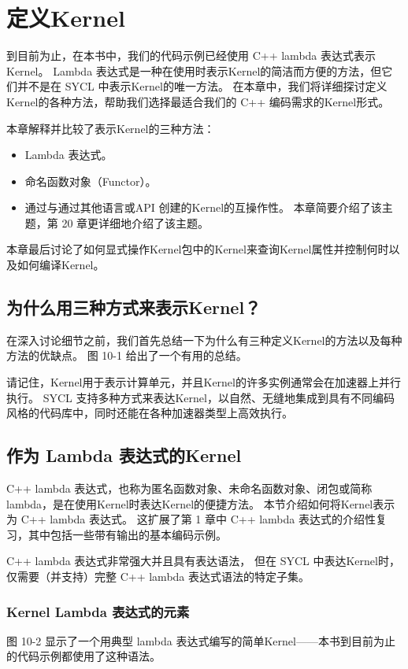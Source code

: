 \section{定义Kernel}
到目前为止，在本书中，我们的代码示例已经使用 C++ lambda 表达式表示Kernel。 
Lambda 表达式是一种在使用时表示Kernel的简洁而方便的方法，但它们并不是在 SYCL 中表示Kernel的唯一方法。 
在本章中，我们将详细探讨定义Kernel的各种方法，帮助我们选择最适合我们的 C++ 编码需求的Kernel形式。

本章解释并比较了表示Kernel的三种方法：

\begin{itemize}
	\item Lambda 表达式。

	\item 命名函数对象（Functor）。

	\item 通过与通过其他语言或API 创建的Kernel的互操作性。 本章简要介绍了该主题，第 20 章更详细地介绍了该主题。
\end{itemize}

本章最后讨论了如何显式操作Kernel包中的Kernel来查询Kernel属性并控制何时以及如何编译Kernel。


\subsection{为什么用三种方式来表示Kernel？}
在深入讨论细节之前，我们首先总结一下为什么有三种定义Kernel的方法以及每种方法的优缺点。 
图 10-1 给出了一个有用的总结。

请记住，Kernel用于表示计算单元，并且Kernel的许多实例通常会在加速器上并行执行。 
SYCL 支持多种方式来表达Kernel，以自然、无缝地集成到具有不同编码风格的代码库中，同时还能在各种加速器类型上高效执行。

\subsection{作为 Lambda 表达式的Kernel}
C++ lambda 表达式，也称为匿名函数对象、未命名函数对象、闭包或简称 lambda，是在使用Kernel时表达Kernel的便捷方法。 
本节介绍如何将Kernel表示为 C++ lambda 表达式。 
这扩展了第 1 章中 C++ lambda 表达式的介绍性复习，其中包括一些带有输出的基本编码示例。

C++ lambda 表达式非常强大并且具有表达语法，
但在 SYCL 中表达Kernel时，仅需要（并支持）完整 C++ lambda 表达式语法的特定子集。

\subsubsection{Kernel Lambda 表达式的元素}
图 10-2 显示了一个用典型 lambda 表达式编写的简单Kernel——本书到目前为止的代码示例都使用了这种语法。

